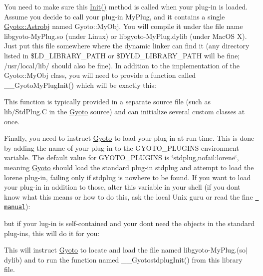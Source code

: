 You need to make sure this \mbox{\hyperlink{namespace_gyoto_1_1_units_aade66d5933d035fb5f0fbb0501e9e972}{Init()}} method is called when your plug-\/in is loaded. Assume you decide to call your plug-\/in My\+Plug, and it contains a single \mbox{\hyperlink{namespace_gyoto_1_1_astrobj}{Gyoto\+::\+Astrobj}} named Gyoto\+::\+My\+Obj. You will compile it under the file name libgyoto-\/\+My\+Plug.\+so (under Linux) or libgyoto-\/\+My\+Plug.\+dylib (under Mac\+OS X). Just put this file somewhere where the dynamic linker can find it (any directory listed in \$\+LD\+\_\+\+LIBRARY\+\_\+\+PATH or \$\+DYLD\+\_\+\+LIBRARY\+\_\+\+PATH will be fine; /usr/local/lib/ should also be fine). In addition to the implementation of the Gyoto\+::\+My\+Obj class, you will need to provide a function called \+\_\+\+\_\+\+Gyoto\+My\+Plug\+Init() which will be exactly this\+: 
\begin{DoxyCode}{0}
\DoxyCodeLine{\}}

\end{DoxyCode}
 This function is typically provided in a separate source file (such as lib/\+Std\+Plug.\+C in the \mbox{\hyperlink{namespace_gyoto}{Gyoto}} source) and can initialize several custom classes at once.

Finally, you need to instruct \mbox{\hyperlink{namespace_gyoto}{Gyoto}} to load your plug-\/in at run time. This is done by adding the name of your plug-\/in to the GYOTO\+\_\+\+PLUGINS environment variable. The default value for GYOTO\+\_\+\+PLUGINS is \char`\"{}stdplug,nofail\+:lorene\char`\"{}, meaning \mbox{\hyperlink{namespace_gyoto}{Gyoto}} should load the standard plug-\/in stdplug and attempt to load the lorene plug-\/in, failing only if stdplug is nowhere to be found. If you want to load your plug-\/in in addition to those, alter this variable in your shell (if you don\textquotesingle{}t know what this means or how to do this, ask the local Unix guru or read the fine \href{http://www.gnu.org/s/bash/manual/bash.html}{\texttt{ manual}})\+: 
\begin{DoxyCode}{0}

\end{DoxyCode}
 but if your lug-\/in is self-\/contained and your don\textquotesingle{}t need the objects in the standard plug-\/ins, this will do it for you\+: 
\begin{DoxyCode}{0}

\end{DoxyCode}
 This will instruct \mbox{\hyperlink{namespace_gyoto}{Gyoto}} to locate and load the file named libgyoto-\/\+My\+Plug.(so$\vert$dylib) and to run the function named \+\_\+\+\_\+\+Gyotostdplug\+Init() from this library file. 